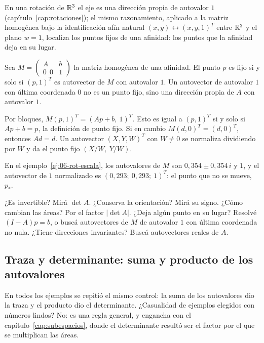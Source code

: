 En una rotación de \(\mathbb{R}^3\) el eje es una dirección propia de autovalor \(1\)
(capítulo~\ref{cap:rotaciones}); el mismo razonamiento, aplicado a la matriz homogénea bajo la
identificación afín natural \((x,y)\leftrightarrow(x,y,1)^T\) entre \(\mathbb{R}^2\) y el plano \(w=1\), localiza los
puntos fijos de una afinidad: los puntos que la afinidad deja en su lugar.

\begin{proposicion}\label{prop:06-fijo-autovector}
Sea \(M=\begin{pmatrix}A&b\\0\ \ 0&1\end{pmatrix}\) la matriz homogénea de una afinidad. El
punto \(p\) es fijo si y solo si \((p,1)^T\) es autovector de \(M\) con autovalor \(1\). Un
autovector de autovalor \(1\) con última coordenada \(0\) no es un punto fijo, sino una
dirección propia de \(A\) con autovalor \(1\).
\end{proposicion}

\begin{demostracion}
Por bloques, \(M(p,1)^T=(Ap+b,\ 1)^T\). Esto es igual a \((p,1)^T\) si y solo si \(Ap+b=p\),
la definición de punto fijo. Si en cambio \(M(d,0)^T=(d,0)^T\), entonces \(Ad=d\). Un
autovector \((X,Y,W)^T\) con \(W\neq0\) se normaliza dividiendo por \(W\) y da el punto fijo
\((X/W,\ Y/W)\).
\end{demostracion}

En el ejemplo~\ref{ej:06-rot-escala}, los autovalores de \(M\) son \(0{,}354\pm0{,}354\,i\)
y \(1\), y el autovector de \(1\) normalizado es \((0{,}293;\ 0{,}293;\ 1)^T\): el punto que no se
mueve, \(p_\ast\).

\begin{idea}
¿Es invertible? Mirá \(\det A\). ¿Conserva la orientación? Mirá su signo. ¿Cómo cambian las
áreas? Por el factor \(|\det A|\). ¿Deja algún punto en su lugar? Resolvé \((I-A)p=b\), o buscá
autovectores de \(M\) de autovalor \(1\) con última coordenada no nula. ¿Tiene direcciones
invariantes? Buscá autovectores reales de \(A\).
\end{idea}

\subsection{Traza y determinante: suma y producto de los autovalores}\label{sec:traza-det-autovalores}

En todos los ejemplos se repitió el mismo control: la suma de los autovalores dio la traza y
el producto dio el determinante. ¿Casualidad de ejemplos elegidos con números lindos? No: es una
regla general, y engancha con el capítulo~\ref{cap:subespacios}, donde el determinante resultó
ser el factor por el que se multiplican las áreas.

